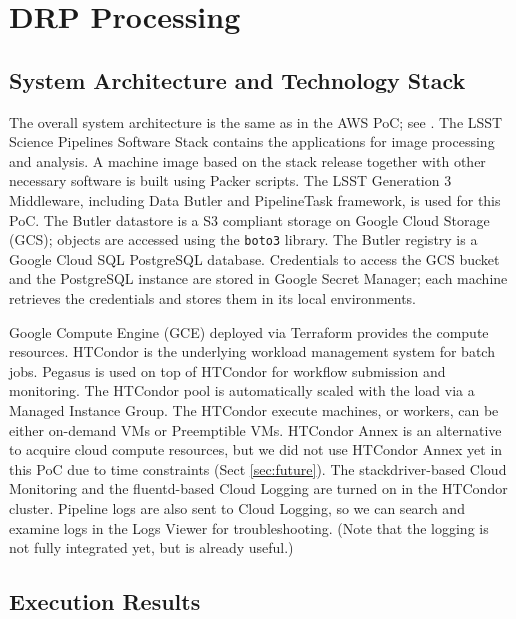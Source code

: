 
\section{DRP Processing} \label{sec:drp}
\subsection{System Architecture and Technology Stack}

The overall system architecture is the same as in the AWS PoC; see .
The LSST Science Pipelines Software Stack contains the applications for image processing and analysis.
A machine image based on the stack release together with other necessary software is built using Packer scripts.
The LSST Generation 3 Middleware, including Data Butler and PipelineTask framework, is used for this PoC.
The Butler datastore is a S3 compliant storage on Google Cloud Storage (GCS); objects are accessed using the \texttt{boto3} library.
The Butler registry is a Google Cloud SQL PostgreSQL database.
Credentials to access the GCS bucket and the PostgreSQL instance are stored in Google Secret Manager; each machine retrieves the credentials and stores them in its local environments.


Google Compute Engine (GCE) deployed via Terraform provides the compute resources.
HTCondor is the underlying workload management system for batch jobs.
Pegasus is used on top of HTCondor for workflow submission and monitoring.
The HTCondor pool is automatically scaled with the load via a Managed Instance Group.
The HTCondor execute machines, or workers, can be either on-demand VMs or Preemptible VMs.
HTCondor Annex is an alternative to acquire cloud compute resources, but we did not use HTCondor Annex yet in this PoC due to time constraints (Sect \ref{sec:future}).
The stackdriver-based Cloud Monitoring and the fluentd-based Cloud Logging are turned on in the HTCondor cluster.
Pipeline logs are also sent to Cloud Logging, so we can search and examine logs in the Logs Viewer for troubleshooting.
(Note that the logging is not fully integrated yet, but is already useful.)


\subsection{Execution Results}


